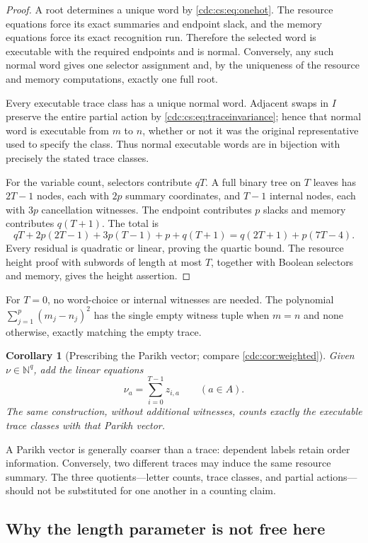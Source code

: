 \documentclass[11pt,a4paper]{article}
\newtheorem{corollary}[corollary]{Corollary}
\theoremstyle{definition}
\theoremstyle{remark}
\newcommand{\N}{\mathbb N}
\begin{document}
\begin{proof}
A root determines a unique word by \eqref{cdc:cs:eq:onehot}. The resource equations
force its exact summaries and endpoint slack, and the memory equations force
its exact recognition run. Therefore the selected word is executable with
the required endpoints and is normal. Conversely, any such normal word gives
one selector assignment and, by the uniqueness of the resource and memory
computations, exactly one full root.

Every executable trace class has a unique normal word. Adjacent swaps in $I$
preserve the entire partial action by \eqref{cdc:cs:eq:traceinvariance}; hence that
normal word is executable from $m$ to $n$, whether or not it was the original
representative used to specify the class. Thus normal executable words are in
bijection with precisely the stated trace classes.

For the variable count, selectors contribute $qT$. A full binary tree on
$T$ leaves has $2T-1$ nodes, each with $2p$ summary coordinates, and $T-1$
internal nodes, each with $3p$ cancellation witnesses. The endpoint contributes
$p$ slacks and memory contributes $q(T+1)$. The total is
\[
qT+2p(2T-1)+3p(T-1)+p+q(T+1)
=q(2T+1)+p(7T-4).
\]
Every residual is quadratic or linear, proving the quartic bound. The resource
height proof with subwords of length at most $T$, together with Boolean
selectors and memory, gives the height assertion.
\end{proof}

For $T=0$, no word-choice or internal witnesses are needed. The polynomial
$\sum_{j=1}^p(m_j-n_j)^2$ has the single empty witness tuple when $m=n$ and
none otherwise, exactly matching the empty trace.

\begin{corollary}[Prescribing the Parikh vector; compare \cref{cdc:cor:weighted}]
Given $\nu\in\N^q$, add the linear equations
\[
\nu_a=\sum_{i=0}^{T-1}z_{i,a}\qquad(a\in A).
\]
The same construction, without additional witnesses, counts exactly the
executable trace classes with that Parikh vector.
\end{corollary}

A Parikh vector is generally coarser than a trace: dependent labels retain
order information. Conversely, two different traces may induce the same
resource summary. The three quotients---letter counts, trace classes, and
partial actions---should not be substituted for one another in a counting
claim.

\subsection{Why the length parameter is not free here}
\end{document}
